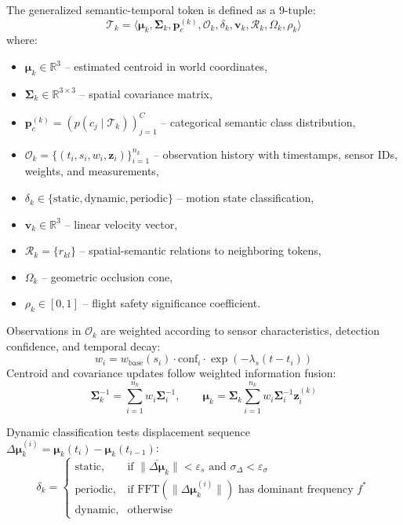 The generalized semantic-temporal token is defined as a 9-tuple:
\begin{equation}
  \mathcal{T}_k = \langle \boldsymbol{\mu}_k, \mathbf{\Sigma}_k, \mathbf{p}_c^{(k)}, \mathcal{O}_k, \delta_k, \mathbf{v}_k, \mathcal{R}_k, \Omega_k, \rho_k \rangle
\end{equation}
where:
\begin{itemize}
  \item $\boldsymbol{\mu}_k \in \mathbb{R}^3$ -- estimated centroid in world coordinates,
  \item $\mathbf{\Sigma}_k \in \mathbb{R}^{3 \times 3}$ -- spatial covariance matrix,
  \item $\mathbf{p}_c^{(k)} = (p(c_j \mid \mathcal{T}_k))_{j=1}^C$ -- categorical semantic class distribution,
  \item $\mathcal{O}_k = \{(t_i, s_i, w_i, \mathbf{z}_i)\}_{i=1}^{n_k}$ -- observation history with timestamps, sensor IDs, weights, and measurements,
  \item $\delta_k \in \{\text{static}, \text{dynamic}, \text{periodic}\}$ -- motion state classification,
  \item $\mathbf{v}_k \in \mathbb{R}^3$ -- linear velocity vector,
  \item $\mathcal{R}_k = \{r_{kl}\}$ -- spatial-semantic relations to neighboring tokens,
  \item $\Omega_k$ -- geometric occlusion cone,
  \item $\rho_k \in [0, 1]$ -- flight safety significance coefficient.
\end{itemize}

Observations in $\mathcal{O}_k$ are weighted according to sensor characteristics, detection confidence, and temporal decay:
\begin{equation}
  w_i = w_{\text{base}}(s_i) \cdot \mathrm{conf}_i \cdot \exp(-\lambda_s (t - t_i))
\end{equation}
Centroid and covariance updates follow weighted information fusion:
\begin{equation}
  \mathbf{\Sigma}_k^{-1} = \sum_{i=1}^{n_k} w_i \mathbf{\Sigma}_i^{-1}, \qquad \boldsymbol{\mu}_k = \mathbf{\Sigma}_k \sum_{i=1}^{n_k} w_i \mathbf{\Sigma}_i^{-1} \mathbf{z}_i^{(k)}
\end{equation}

Dynamic classification tests displacement sequence $\Delta \boldsymbol{\mu}_k^{(i)} = \boldsymbol{\mu}_k(t_i) - \boldsymbol{\mu}_k(t_{i-1})$:
\begin{equation}
  \delta_k = \begin{cases}
    \text{static}, & \text{if } \|\bar{\Delta \boldsymbol{\mu}}_k\| < \varepsilon_s \text{ and } \sigma_{\Delta} < \varepsilon_\sigma \\
    \text{periodic}, & \text{if } \mathrm{FFT}(\|\Delta \boldsymbol{\mu}_k^{(i)}\|) \text{ has dominant frequency } f^* \\
    \text{dynamic}, & \text{otherwise}
  \end{cases}
\end{equation}

